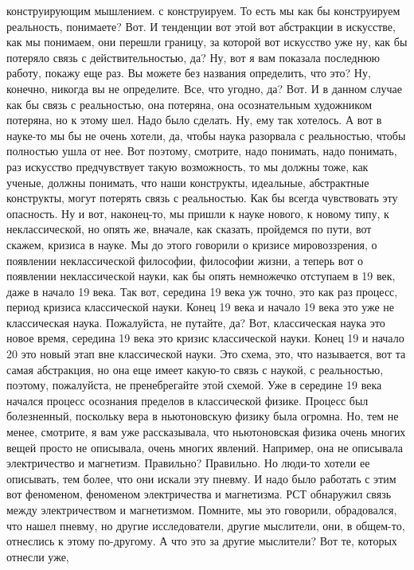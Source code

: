 конструирующим мышлением. с конструируем. То есть мы как бы конструируем
реальность, понимаете? Вот. И тенденции вот этой вот абстракции в искусстве, как
мы понимаем, они перешли границу, за которой вот искусство уже ну, как бы
потеряло связь с действительностью, да? Ну, вот я вам показала последнюю работу,
покажу еще раз. Вы можете без названия определить, что это? Ну, конечно, никогда
вы не определите. Все, что угодно, да? Вот. И в данном случае как бы связь с
реальностью, она потеряна, она осознательным художником потеряна, но к этому
шел. Надо было сделать. Ну, ему так хотелось. А вот в науке-то мы бы не очень
хотели, да, чтобы наука разорвала с реальностью, чтобы полностью ушла от нее.
Вот поэтому, смотрите, надо понимать, надо понимать, раз искусство предчувствует
такую возможность, то мы должны тоже, как ученые, должны понимать, что наши
конструкты, идеальные, абстрактные конструкты, могут потерять связь с
реальностью. Как бы всегда чувствовать эту опасность. Ну и вот, наконец-то, мы
пришли к науке нового, к новому типу, к неклассической, но опять же, вначале,
как сказать, пройдемся по пути, вот скажем, кризиса в науке. Мы до этого
говорили о кризисе мировоззрения, о появлении неклассической философии,
философии жизни, а теперь вот о появлении неклассической науки, как бы опять
немножечко отступаем в 19 век, даже в начало 19 века. Так вот, середина 19 века
уж точно, это как раз процесс, период кризиса классической науки. Конец 19 века
и начало 19 века это уже не классическая наука. Пожалуйста, не путайте, да? Вот,
классическая наука это новое время, середина 19 века это кризис классической
науки. Конец 19 и начало 20 это новый этап вне классической науки. Это схема,
это, что называется, вот та самая абстракция, но она еще имеет какую-то связь с
наукой, с реальностью, поэтому, пожалуйста, не пренебрегайте этой схемой. Уже в
середине 19 века начался процесс осознания пределов в классической физике.
Процесс был болезненный, поскольку вера в ньютоновскую физику была огромна. Но,
тем не менее, смотрите, я вам уже рассказывала, что ньютоновская физика очень
многих вещей просто не описывала, очень многих явлений. Например, она не
описывала электричество и магнетизм. Правильно? Правильно. Но люди-то хотели ее
описывать, тем более, что они искали эту пневму. И надо было работать с этим вот
феноменом, феноменом электричества и магнетизма. РСТ обнаружил связь между
электричеством и магнетизмом. Помните, мы это говорили, обрадовался, что нашел
пневму, но другие исследователи, другие мыслители, они, в общем-то, отнеслись к
этому по-другому. А что это за другие мыслители? Вот те, которых отнесли уже,

